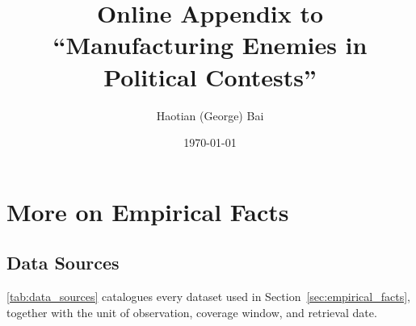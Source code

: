 \documentclass[11pt,twoside]{extarticle}
\title{Online Appendix to ``Manufacturing Enemies in Political Contests''}
\author{Haotian (George) Bai}
\date{\today}
\begin{document}
\maketitle

\tableofcontents
\clearpage

\appendix
\renewcommand{\thesection}{\Alph{section}}
\renewcommand{\thesubsection}{\Alph{section}.\arabic{subsection}}
\renewcommand{\thetable}{A.\arabic{table}}
\renewcommand{\thefigure}{A.\arabic{figure}}
\setcounter{table}{0}
\setcounter{figure}{0}

\section{More on Empirical Facts} \label{app:more_empirical_facts}

\subsection{Data Sources} \label{app:data_sources}

\autoref{tab:data_sources} catalogues every dataset used in
Section~\ref{sec:empirical_facts}, together with the unit of observation,
coverage window, and retrieval date.
\end{document}
